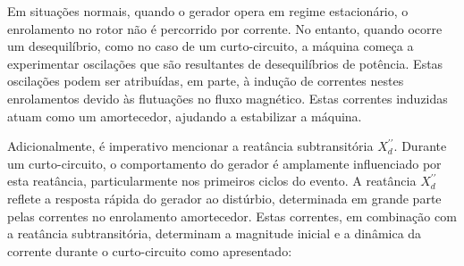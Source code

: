 \noindent Em situações normais, quando o gerador opera em regime estacionário, o enrolamento no rotor não é percorrido por corrente. No entanto, quando ocorre um desequilíbrio, como no caso de um curto-circuito, a máquina começa a experimentar oscilações que são resultantes de desequilíbrios de potência. Estas oscilações podem ser atribuídas, em parte, à indução de correntes nestes enrolamentos devido às flutuações no fluxo magnético. Estas correntes induzidas atuam como um amortecedor, ajudando a estabilizar a máquina.

Adicionalmente, é imperativo mencionar a reatância subtransitória $X_d^{\prime\prime}$. Durante um curto-circuito, o comportamento do gerador é amplamente influenciado por esta reatância, particularmente nos primeiros ciclos do evento. A reatância $X_d^{\prime\prime}$ reflete a resposta rápida do gerador ao distúrbio, determinada em grande parte pelas correntes no enrolamento amortecedor. Estas correntes, em combinação com a reatância subtransitória, determinam a magnitude inicial e a dinâmica da corrente durante o curto-circuito como apresentado:

\begin{figure}[H]
    \centering
\end{figure}

